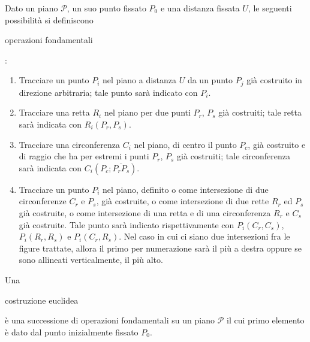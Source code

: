\begin{definizione}  
Dato un piano $\mathscr{P}$, un suo punto fissato $P_{0}$ e una distanza fissata $U$, le seguenti possibilità si definiscono \begin{bfseries}operazioni fondamentali\end{bfseries}:

\begin{enumerate}

\item Tracciare un punto $P_{i}$ nel piano a distanza $U$ da un punto $P_{j}$ già costruito in direzione arbitraria; tale punto sarà indicato con $P_{i}$.

\item Tracciare una retta $R_{i}$ nel piano per due punti $P_{r}$, $P_{s}$ già costruiti; tale retta sarà indicata con $R_{i}(P_{r},P_{s})$.

\item Tracciare una circonferenza $C_{i}$ nel piano, di centro il punto $P_{c}$, già costruito e di raggio che ha per estremi i punti $P_{r}$, $P_{s}$ già costruiti; tale circonferenza sarà indicata con $C_{i} (P_{c}; \overline{P_{r}P_{s}})$.

\item Tracciare un punto $P_{i}$ nel piano, definito o come intersezione di  due circonferenze $C_{r}$ e $P_{s}$, già costruite, o come intersezione di due rette $R_{r}$ ed $P_{s}$ già costruite, o come intersezione di una retta e di una circonferenza $R_{r}$ e $C_{s}$ già costruite. Tale punto sarà indicato rispettivamente con $P_{i}(C_{r}, C_{s})$, $P_{i}(R_{r}, R_{s})$ e $P_{i}(C_{r}, R_{s})$. Nel caso in cui ci siano due intersezioni fra le figure trattate, allora il primo per numerazione sarà il più a destra oppure se sono allineati verticalmente, il più alto. 

\end{enumerate}
\end{definizione}

\begin{definizione} 
Una \begin{bfseries}costruzione euclidea\end{bfseries} è una successione di operazioni fondamentali su un piano $\mathscr{P}$ il cui primo elemento è dato dal punto inizialmente fissato $P_{0}$.
\end{definizione}



